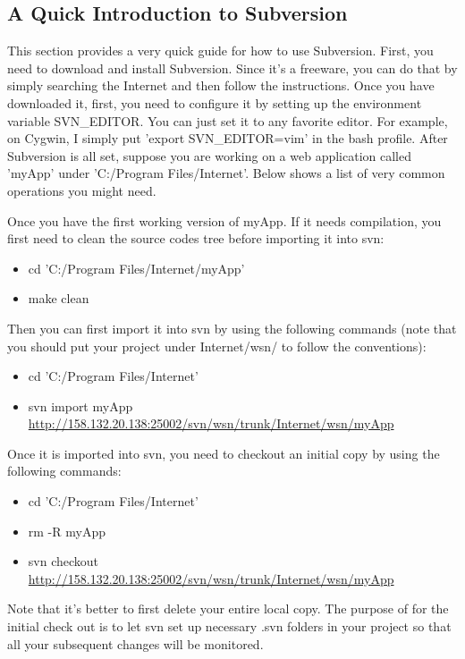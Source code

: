 \subsection{A Quick Introduction to Subversion}
\label{sec:svn}
This section provides a very quick guide for how to use Subversion. First, you need to download and install Subversion. Since it's a freeware, you can do that by simply searching the Internet and then follow the instructions. Once you have downloaded it, first, you need to configure it by setting up the environment variable SVN\_EDITOR. You can just set it to any favorite editor. For example, on Cygwin, I simply put 'export SVN\_EDITOR=vim' in the bash profile. After Subversion is all set, suppose you are working on a web application called 'myApp' under 'C:/Program Files/Internet'. Below shows a list of very common operations you might need.

Once you have the first working version of myApp. If it needs compilation, you first need to clean the source codes tree before importing it into svn:
\begin{itemize}
\item cd 'C:/Program Files/Internet/myApp'
\item make clean
\end{itemize}

Then you can first import it into svn by using the following commands (note that you should put your project under Internet/wsn/ to follow the conventions):
\begin{itemize}
\item cd 'C:/Program Files/Internet'
\item svn import myApp \url{http://158.132.20.138:25002/svn/wsn/trunk/Internet/wsn/myApp}
\end{itemize}

Once it is imported into svn, you need to checkout an initial copy by using the following commands:
\begin{itemize}
\item cd 'C:/Program Files/Internet'
\item rm -R myApp
\item svn checkout \url{http://158.132.20.138:25002/svn/wsn/trunk/Internet/wsn/myApp}
\end{itemize}
Note that it's better to first delete your entire local copy. The purpose of for the initial check out is to let svn set up necessary .svn folders in your project so that all your subsequent changes will be monitored.

